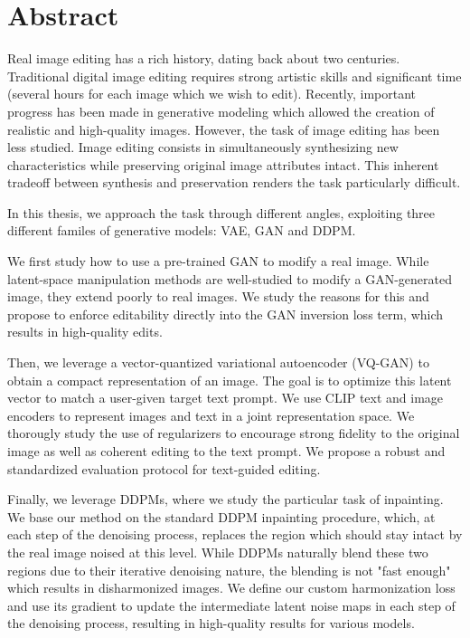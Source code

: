 \cleardoublepage
\setcounter{page}{1}

\chapter{Abstract}

Real image editing has a rich history, dating back about two centuries. Traditional digital image 
editing requires strong artistic skills and significant time (several hours for each image 
which we wish to edit). Recently,  important progress has 
been made in generative modeling which allowed the creation of realistic and high-quality images. 
However, 
the task of image editing has been less studied. Image editing consists in 
simultaneously synthesizing new characteristics while preserving original image attributes intact. 
This inherent tradeoff between synthesis and preservation renders the task particularly difficult.

In this thesis, we approach the task through different angles, exploiting three different familes of 
generative models: \ac{VAE}, \ac{GAN} and \ac{DDPM}.

We first study how to use a pre-trained \ac{GAN} to modify a real image.
While latent-space manipulation methods are well-studied to modify a \ac{GAN}-generated image, 
they extend poorly to real images. We study the reasons for this and propose 
to enforce editability directly into the \ac{GAN} inversion loss term, which results in 
high-quality edits.

Then, we leverage a vector-quantized variational autoencoder (VQ-GAN) to obtain a compact representation of an image. 
The goal is to optimize this latent vector to match a user-given target text prompt. We use CLIP text and image encoders
to represent images and text in a joint representation space. We thorougly study the use of 
regularizers to encourage strong fidelity to the original image as well as coherent editing to the text prompt.
We propose a robust and standardized evaluation protocol for text-guided editing.

Finally, we leverage \ac{DDPM}s, where we study the particular task of inpainting. 
We base our method on the standard \ac{DDPM} inpainting procedure, which, at each step of the denoising process, 
replaces the region which should stay intact by the real image noised at this level. While \ac{DDPM}s naturally blend these two regions due to their iterative 
denoising nature, the blending is not "fast enough" which results in disharmonized images. We define our custom harmonization loss 
and use its gradient to update the intermediate latent noise maps in each step of the denoising process, resulting in high-quality results for various 
models.


